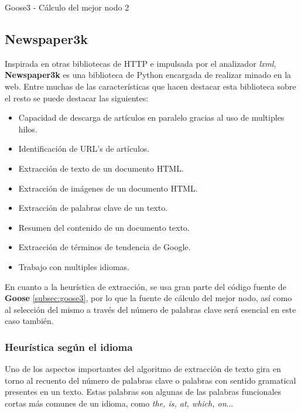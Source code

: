 \begin{codefloat}
  
  \caption{Goose3 - Cálculo del mejor nodo 2}
  \label{cod:goose3 - calculo del mejor nodo 2}
\end{codefloat}

\subsection{Newspaper3k}
\label{subsec:newspaper3k}

Inspirada en otras bibliotecas de HTTP e impulsada por el analizador \emph{lxml}, \textbf{Newspaper3k}
\cite{newspaper3k} es una biblioteca de Python encargada de realizar minado en la web. Entre muchas de las
características que hacen destacar esta biblioteca sobre el resto se puede destacar las siguientes:

\begin{itemize}
  \item Capacidad de descarga de artículos en paralelo gracias al uso de multiples hilos.
  \item Identificación de URL's de artículos.
  \item Extracción de texto de un documento HTML.
  \item Extracción de imágenes de un documento HTML.
  \item Extracción de palabras clave de un texto.
  \item Resumen del contenido de un documento texto.
  \item Extracción de términos de tendencia de Google.
  \item Trabajo con multiples idiomas.
\end{itemize}

En cuanto a la heurística de extracción, se usa gran parte del código fuente de \textbf{Goose} 
\ref{subsec:goose3}, por lo que la fuente de cálculo del mejor nodo, así como al selección del mismo a 
través del número de palabras clave será esencial en este caso también.

\subsubsection{Heurística según el idioma}
\label{subsubsec:heuristica segun el idioma}

Uno de los aspectos importantes del algoritmo de extracción de texto gira en torno al recuento del número 
de palabras clave o palabras con sentido gramatical presentes en un texto. Estas palabras son algunas de 
las palabras funcionales cortas más comunes de un idioma, como \emph{the, is, at, which, on}... 

